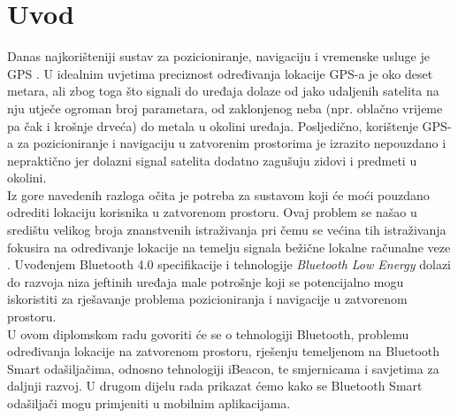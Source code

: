 \chapter{Uvod}

Danas najkorišteniji sustav za pozicioniranje, navigaciju i vremenske usluge je GPS . %
U idealnim uvjetima preciznost određivanja lokacije GPS-a je oko deset metara, ali zbog toga što signali do uređaja dolaze od jako udaljenih satelita na nju utječe ogroman broj parametara, od zaklonjenog neba (npr. oblačno vrijeme pa čak i krošnje drveća) do metala u okolini uređaja. %
Posljedično, korištenje GPS-a za pozicioniranje i navigaciju u zatvorenim prostorima je izrazito nepouzdano i nepraktično jer  dolazni signal satelita dodatno zagušuju zidovi i predmeti u okolini.
\\

Iz gore navedenih razloga očita je potreba za sustavom koji će moći pouzdano odrediti lokaciju korisnika u zatvorenom prostoru. Ovaj problem se našao u središtu velikog broja znanstvenih istraživanja pri čemu se većina tih istraživanja fokusira na određivanje lokacije na temelju signala bežične lokalne računalne veze . %
Uvođenjem Bluetooth 4.0 specifikacije i tehnologije \textit{Bluetooth Low Energy} dolazi do razvoja niza jeftinih uređaja male potrošnje koji se potencijalno mogu iskoristiti za rješavanje problema pozicioniranja i navigacije u zatvorenom prostoru.
\\

U ovom diplomskom radu govoriti će se o tehnologiji Bluetooth, problemu određivanja lokacije na zatvorenom prostoru, rješenju temeljenom na Bluetooth Smart odašiljačima, odnosno tehnologiji iBeacon, te smjernicama i savjetima za daljnji razvoj. U drugom dijelu rada prikazat ćemo kako se Bluetooth Smart odašiljači mogu primjeniti u mobilnim aplikacijama.